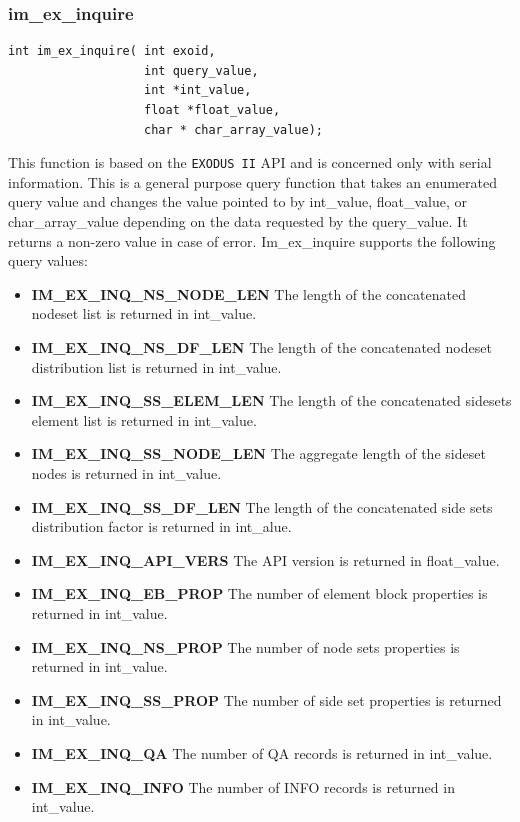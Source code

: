 \subsubsection{im\_ex\_inquire}
{\ttfamily  \begin{verbatim}
int im_ex_inquire( int exoid,	
                   int query_value,
                   int *int_value,
                   float *float_value,
                   char * char_array_value);
\end{verbatim}}
This function is based on the \texttt{EXODUS II} API and is concerned only with serial information. This is a general purpose query function that takes an enumerated query value and changes the value pointed to by int\_value, float\_value, or char\_array\_value depending on the data requested by the query\_value. It returns a non-zero value in case of error. Im\_ex\_inquire supports the following query values:
\begin{itemize}\addtolength{\itemsep}{-0.5\baselineskip}\renewcommand{\labelitemi}{}
	\item \textbf{IM\_EX\_INQ\_NS\_NODE\_LEN} The length of the concatenated nodeset list is returned in int\_value.
  	\item \textbf{IM\_EX\_INQ\_NS\_DF\_LEN} The length of the concatenated nodeset distribution list is returned in int\_value.
  	\item \textbf{IM\_EX\_INQ\_SS\_ELEM\_LEN} The length of the concatenated sidesets element list is returned in int\_value.
  	\item \textbf{IM\_EX\_INQ\_SS\_NODE\_LEN} The aggregate length of the sideset nodes is returned in int\_value.
  	\item \textbf{IM\_EX\_INQ\_SS\_DF\_LEN } The length of the concatenated side sets distribution factor is returned in int\_alue.
  	\item \textbf{IM\_EX\_INQ\_API\_VERS} The API version is returned in float\_value.
	\item \textbf{IM\_EX\_INQ\_EB\_PROP} The number of element block properties is returned in int\_value.
	\item \textbf{IM\_EX\_INQ\_NS\_PROP} The number of node sets properties is returned in int\_value.
	\item \textbf{IM\_EX\_INQ\_SS\_PROP} The number of side set properties is returned in int\_value.
	\item \textbf{IM\_EX\_INQ\_QA} The number of QA records is returned in int\_value.
	\item \textbf{IM\_EX\_INQ\_INFO} The number of INFO records is returned in int\_value.
	 
\end{itemize} 

